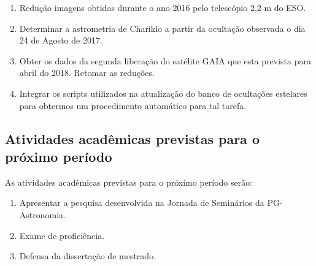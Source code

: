 \documentclass[a4paper, 11pt]{article}
\begin{document}
\begin{enumerate}
\item Redução imagens obtidas durante o ano 2016 pelo telescópio 2,2 m do ESO.
\item Determinar a astrometria de Chariklo a partir da ocultação observada o dia 24 de Agosto de 2017. 
\item Obter os dados da segunda liberação do satélite GAIA que esta prevista para abril do 2018. Retomar as redu\c c\~oes.
\item Integrar os scripts utilizados na atualiza\c c\~ao do banco de oculta\c c\~oes estelares para obtermos um procedimento autom\'atico para tal tarefa.
\end{enumerate}
\subsection{Atividades acadêmicas previstas para o próximo período}

As atividades acadêmicas previstas para o pr\'oximo per\'iodo ser\~ao:

\begin{enumerate}[resume]
  \item Apresentar a pesquisa desenvolvida na Jornada de Seminários da PG-Astronomia.
  \item Exame de proficiência.
  \item Defensa da dissertação de mestrado.  
\end{enumerate}
\end{document}
